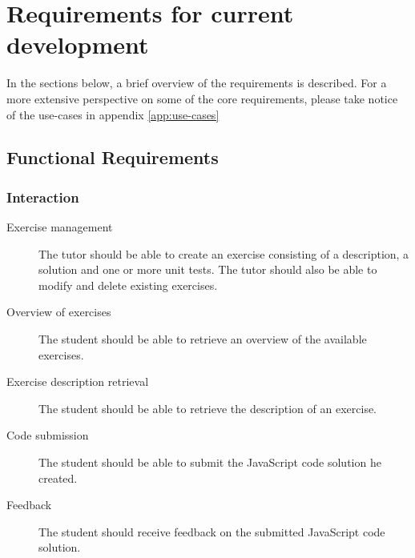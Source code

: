
\section{Requirements for current development}
In the sections below, a brief overview of the requirements is described.
For a more extensive perspective on some of the core requirements, 
please take notice of the use-cases in appendix \ref{app:use-cases}
\subsection{Functional Requirements}
\subsubsection{Interaction}
\begin{description}
  \item[Exercise management] The tutor should be able to create an exercise
    consisting of a description, a solution and one or more unit tests. The
    tutor should also be able to modify and delete existing exercises.
  \item[Overview of exercises] The student should be able to retrieve an
    overview of the available exercises.
  \item[Exercise description retrieval] The student should be able to retrieve
    the description of an exercise.
  \item[Code submission] The student should be able to submit the JavaScript
    code solution he created.
  \item[Feedback] The student should receive feedback on the submitted
    JavaScript code solution.
\end{description}

